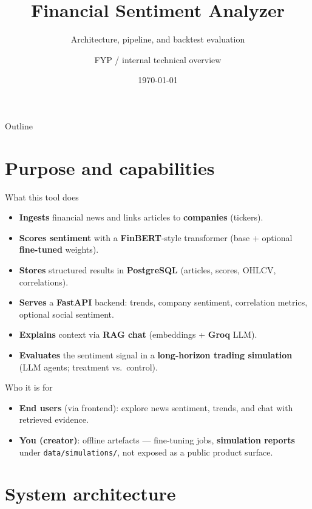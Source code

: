 \documentclass[aspectratio=169,11pt]{beamer}
\title{Financial Sentiment Analyzer}
\subtitle{Architecture, pipeline, and backtest evaluation}
\author{FYP / internal technical overview}
\date{\today}
\begin{document}
\begin{frame}
  \titlepage
\end{frame}

\begin{frame}{Outline}
  \tableofcontents
\end{frame}

\section{Purpose and capabilities}

\begin{frame}{What this tool does}
  \begin{itemize}
    \item \textbf{Ingests} financial news and links articles to \textbf{companies} (tickers).
    \item \textbf{Scores sentiment} with a \textbf{FinBERT}-style transformer (base + optional \textbf{fine-tuned} weights).
    \item \textbf{Stores} structured results in \textbf{PostgreSQL} (articles, scores, OHLCV, correlations).
    \item \textbf{Serves} a \textbf{FastAPI} backend: trends, company sentiment, correlation metrics, optional social sentiment.
    \item \textbf{Explains} context via \textbf{RAG chat} (embeddings + \textbf{Groq} LLM).
    \item \textbf{Evaluates} the sentiment signal in a \textbf{long-horizon trading simulation} (LLM agents; treatment vs.\ control).
  \end{itemize}
\end{frame}

\begin{frame}{Who it is for}
  \begin{itemize}
    \item \textbf{End users} (via frontend): explore news sentiment, trends, and chat with retrieved evidence.
    \item \textbf{You (creator)}: offline artefacts --- fine-tuning jobs, \textbf{simulation reports} under \texttt{data/simulations/}, not exposed as a public product surface.
  \end{itemize}
\end{frame}

\section{System architecture}
\end{document}
